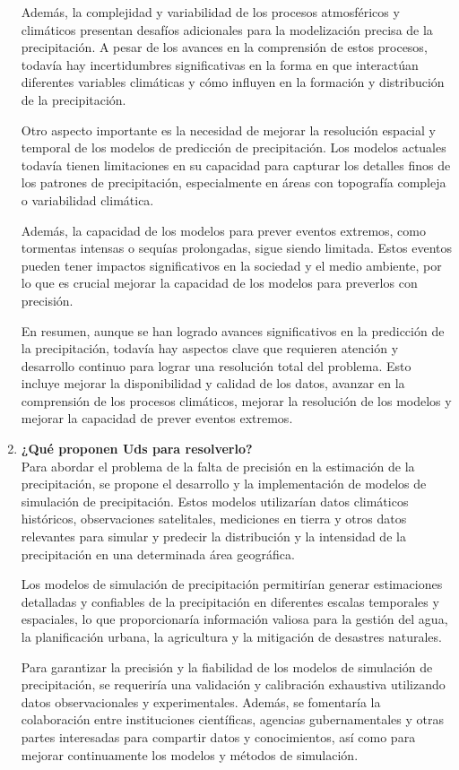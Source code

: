 \documentclass{article}
\begin{document}
\begin{enumerate}
    Además, la complejidad y variabilidad de los procesos atmosféricos y climáticos presentan desafíos adicionales para la modelización precisa de la precipitación. A pesar de los avances en la comprensión de estos procesos, todavía hay incertidumbres significativas en la forma en que interactúan diferentes variables climáticas y cómo influyen en la formación y distribución de la precipitación.

    Otro aspecto importante es la necesidad de mejorar la resolución espacial y temporal de los modelos de predicción de precipitación. Los modelos actuales todavía tienen limitaciones en su capacidad para capturar los detalles finos de los patrones de precipitación, especialmente en áreas con topografía compleja o variabilidad climática.

    Además, la capacidad de los modelos para prever eventos extremos, como tormentas intensas o sequías prolongadas, sigue siendo limitada. Estos eventos pueden tener impactos significativos en la sociedad y el medio ambiente, por lo que es crucial mejorar la capacidad de los modelos para preverlos con precisión.

    En resumen, aunque se han logrado avances significativos en la predicción de la precipitación, todavía hay aspectos clave que requieren atención y desarrollo continuo para lograr una resolución total del problema. Esto incluye mejorar la disponibilidad y calidad de los datos, avanzar en la comprensión de los procesos climáticos, mejorar la resolución de los modelos y mejorar la capacidad de prever eventos extremos.
    
    \item \textbf{¿Qué proponen Uds para resolverlo?} \\
    
    Para abordar el problema de la falta de precisión en la estimación de la precipitación, se propone el desarrollo y la implementación de modelos de simulación de precipitación. Estos modelos utilizarían datos climáticos históricos, observaciones satelitales, mediciones en tierra y otros datos relevantes para simular y predecir la distribución y la intensidad de la precipitación en una determinada área geográfica.

    Los modelos de simulación de precipitación permitirían generar estimaciones detalladas y confiables de la precipitación en diferentes escalas temporales y espaciales, lo que proporcionaría información valiosa para la gestión del agua, la planificación urbana, la agricultura y la mitigación de desastres naturales.

    Para garantizar la precisión y la fiabilidad de los modelos de simulación de precipitación, se requeriría una validación y calibración exhaustiva utilizando datos observacionales y experimentales. Además, se fomentaría la colaboración entre instituciones científicas, agencias gubernamentales y otras partes interesadas para compartir datos y conocimientos, así como para mejorar continuamente los modelos y métodos de simulación.
\end{enumerate}
\end{document}
